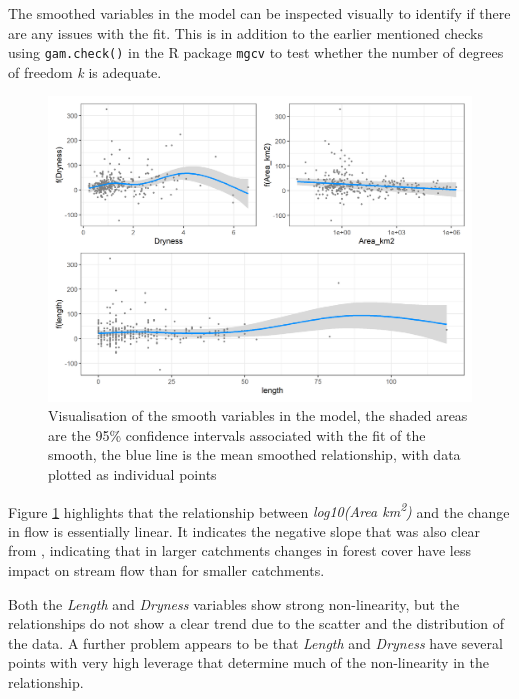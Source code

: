 \documentclass[]{elsarticle} %
\begin{document}
The smoothed variables in the model can be inspected visually to identify if there are any issues with the fit. This is in addition to the earlier mentioned checks using \texttt{gam.check()} in the R package \texttt{mgcv} to test whether the number of degrees of freedom \emph{k} is adequate.

\begin{figure}
\includegraphics[width=0.9\linewidth]{Forest_model_allsmooths} \caption{Visualisation of the smooth variables in the model, the shaded areas are the 95\% confidence intervals associated with the fit of the smooth, the blue line is the mean smoothed relationship, with data plotted as individual points}\label{fig:smoothsmodelall}
\end{figure}

Figure \ref{fig:smoothsmodelall} highlights that the relationship between \emph{log10(Area km\textsuperscript{2})} and the change in flow is essentially linear. It indicates the negative slope that was also clear from \citet{zhang2017}, indicating that in larger catchments changes in forest cover have less impact on stream flow than for smaller catchments.

Both the \emph{Length} and \emph{Dryness} variables show strong non-linearity, but the relationships do not show a clear trend due to the scatter and the distribution of the data. A further problem appears to be that \emph{Length} and \emph{Dryness} have several points with very high leverage that determine much of the non-linearity in the relationship.
\end{document}
